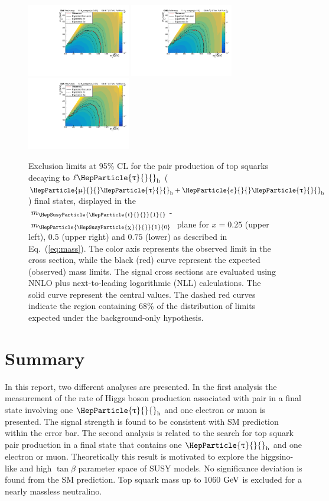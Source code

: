 \documentclass[12pt, a4paper]{article}
\newcommand{\GeV}{\ensuremath{\text{Ge\hspace{-.08em}V}}{}\xspace}
\DeclareRobustCommand{\PQt}{\HepParticle{t}{}{}} %
\DeclareRobustCommand{\PAQt}{{\HepAntiParticle{\PQt}{}{}}\xspace} %
\DeclareRobustCommand{\Pe}{{\HepParticle{e}{}{}}\xspace} %
\DeclareRobustCommand{\PGm}{{\HepParticle{\upmu}{}{}}\xspace} %
\DeclareRobustCommand{\PGt}{{\HepParticle{\uptau}{}{}}\xspace} %
\DeclareRobustCommand{\PSQtDo}{{\HepSusyParticle{\PQt}{1}{}}\xspace}
\DeclareRobustCommand{\PSGc}{{\HepSusyParticle{\upchi}{}{}}\xspace} %
\DeclareRobustCommand{\PSGczDo}{{\HepParticle{\PSGc}{1}{0}}\xspace}
\newcommand{\ttbar}{\PQt{}\PAQt} %
\newcommand{\tauh}{\ensuremath{\PGt_\mathrm{h}}\xspace}
\newcommand{\CL}{\ensuremath{\text{CL}}\xspace}
\begin{document}
\begin{figure}[htb!]
	\centering
	\includegraphics[width=0.4\textwidth]{Fig/exclusion0p25_LTau_FullRun2_Aug4.pdf}
	\includegraphics[width=0.4\textwidth]{Fig/exclusion0p5_LTau_FullRun2_Aug4.pdf}
	\includegraphics[width=0.4\textwidth]{Fig/exclusion0p75_LTau_FullRun2_Aug4.pdf}
	
	\caption{
		Exclusion limits at 95\% \CL for the pair production of top squarks decaying to $\ell\tauh$ ($\PGm\tauh+\Pe\tauh$) final states, displayed in the $ {m_{\PSQtDo}}$-$m_{\PSGczDo} $ plane for $x= 0.25$ (upper left), $0.5$ (upper right) and $0.75$ (lower) as described in Eq.~(\ref{eq:mass}). The color axis represents the observed limit in the cross section, while the black (red) curve represent the expected (observed) mass limits. The signal cross sections are evaluated using NNLO plus next-to-leading logarithmic (NLL) calculations. The solid curve represent the central values. The dashed red curves indicate the region containing 68\% of the distribution of limits expected under the background-only hypothesis. 
	}
	\label{fig:2Dlimit}
\end{figure}

\section{Summary}
In this report, two different analyses are presented. In the first analysis the measurement of the rate of Higgs boson production associated with \ttbar pair in a final state involving one \tauh and one electron or muon is presented. The signal strength is found to be consistent with SM prediction within the error bar. The second analysis is related to the search for top squark pair production in a final state that contains one \tauh and one electron or muon. Theoretically this result is motivated to
explore the higgsino-like and high $\tan\beta$ parameter space of SUSY models. No significance deviation is found from the SM prediction. Top squark mass up to 1060 \GeV is excluded for a nearly massless neutralino.
\clearpage


\end{document}
